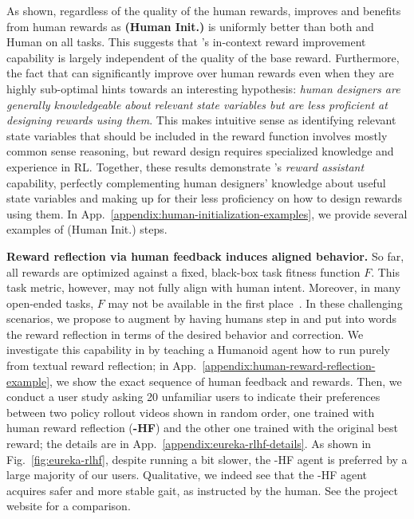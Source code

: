 As shown, regardless of the quality of the human rewards, \ourmethod improves and benefits from human rewards as \textbf{\ourmethod (Human Init.)} is uniformly better than both \ourmethod and Human on all tasks. This suggests that \ourmethod's in-context reward improvement capability is largely independent of the quality of the base reward. Furthermore, the fact that \ourmethod can significantly improve over human rewards even when they are highly sub-optimal hints towards an interesting hypothesis: \textit{human designers are generally knowledgeable about relevant state variables but are less proficient at designing rewards using them}. This makes intuitive sense as identifying relevant state variables that should be included in the reward function involves mostly common sense reasoning, but reward design requires specialized knowledge and experience in RL. Together, these results demonstrate \ourmethod's \textit{reward assistant} capability, perfectly complementing human designers' knowledge about useful state variables and making up for their less proficiency on how to design rewards using them. In App.~\ref{appendix:human-initialization-examples}, we provide several examples of \ourmethod (Human Init.) steps.





\textbf{Reward reflection via human feedback induces aligned behavior.} So far, all \ourmethod rewards are optimized against a fixed, black-box task fitness function $F$. This task metric, however, may not fully align with human intent. Moreover, in many open-ended tasks, $F$ may not be available in the first place~\citep{fan2022minedojo}. In these challenging scenarios, we propose to augment \ourmethod by having humans step in and put into words the reward reflection in terms of the desired behavior and correction. We investigate this capability in \ourmethod by teaching a Humanoid agent how to run purely from textual reward reflection; in App.~\ref{appendix:human-reward-reflection-example}, we show the exact sequence of human feedback and \ourmethod rewards. Then, we conduct a user study asking 20 unfamiliar users to indicate their preferences between two policy rollout videos shown in random order, one trained with human reward reflection (\textbf{\ourmethod-HF}) and the other one trained with the original best \ourmethod reward; the details are in App.~\ref{appendix:eureka-rlhf-details}. As shown in Fig.~\ref{fig:eureka-rlhf}, despite running a bit slower, the \ourmethod-HF agent is preferred by a large majority of our users. Qualitative, we indeed see that the \ourmethod-HF agent acquires safer and more stable gait, as instructed by the human. See the project website for a comparison.


